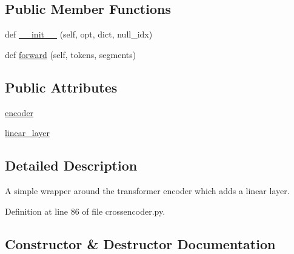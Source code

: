 \subsection*{Public Member Functions}
\begin{DoxyCompactItemize}
\item 
def \hyperlink{classparlai_1_1agents_1_1transformer_1_1crossencoder_1_1CrossEncoderModule_ad002e8a3432930432430e2b4c435cc3e}{\+\_\+\+\_\+init\+\_\+\+\_\+} (self, opt, dict, null\+\_\+idx)
\item 
def \hyperlink{classparlai_1_1agents_1_1transformer_1_1crossencoder_1_1CrossEncoderModule_a86a9cf18bddebb5a1ee9c4096cfe7c20}{forward} (self, tokens, segments)
\end{DoxyCompactItemize}
\subsection*{Public Attributes}
\begin{DoxyCompactItemize}
\item 
\hyperlink{classparlai_1_1agents_1_1transformer_1_1crossencoder_1_1CrossEncoderModule_a7b3493099f48331b36c465cc393b5145}{encoder}
\item 
\hyperlink{classparlai_1_1agents_1_1transformer_1_1crossencoder_1_1CrossEncoderModule_a50568203fcea07cca868109b95dc8dfc}{linear\+\_\+layer}
\end{DoxyCompactItemize}


\subsection{Detailed Description}
\begin{DoxyVerb}A simple wrapper around the transformer encoder which adds a linear layer.
\end{DoxyVerb}
 

Definition at line 86 of file crossencoder.\+py.



\subsection{Constructor \& Destructor Documentation}
\mbox{\label{classparlai_1_1agents_1_1transformer_1_1crossencoder_1_1CrossEncoderModule_ad002e8a3432930432430e2b4c435cc3e}} 
